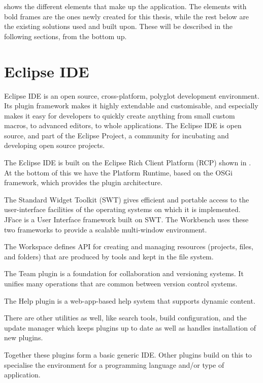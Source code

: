 	 shows the different elements that make up the application.
	The elements with bold frames are the ones newly created for this thesis, while
	the rest below are the existing solutions used and built upon. These will be
	described in the following sections, from the bottom up.

\section{Eclipse IDE}
Eclipse IDE \cite{eclipse} is an open source, cross-platform, polyglot
development environment.
Its plugin framework makes it highly extendable and customisable, and
especially makes it easy for developers to quickly create anything from small
custom macros, to advanced editors, to whole applications. The Eclipse IDE is
open source, and part of the Eclipse Project, a community for incubating and
developing open source projects.


The Eclipse IDE is built on the Eclipse Rich Client Platform (RCP) shown in
. At the bottom of this we have the Platform Runtime, based
on the OSGi framework, which provides the plugin architecture.



The Standard Widget Toolkit (SWT) gives efficient and portable access to the
user-interface facilities of the operating systems on which it is implemented.
JFace is a User Interface framework built on SWT. The Workbench uses these two
frameworks to provide a scalable multi-window environment. 

The Workspace defines API for creating and managing resources (projects, files,
and folders) that are produced by tools and kept in the file system.

The Team plugin is a foundation for collaboration and versioning systems. It
unifies many operations that are common between version control systems.

The Help plugin is a web-app-based help system that supports dynamic content.

There are other utilities as well, like search tools, build configuration, and
the update manager which keeps plugins up to date as well as handles
installation of new plugins.

Together these plugins form a basic generic IDE. Other plugins build on this to
specialise the environment for a programming language and/or type of
application.

